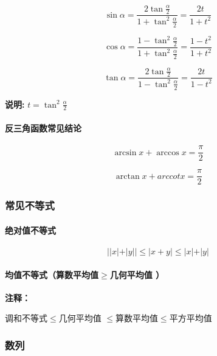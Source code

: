 \documentclass[
]{article}
\begin{document}
\[\sin \alpha = \frac{2\tan{\frac{\alpha}{2}}}{1+\tan^2 \frac{\alpha}{2}} = \frac{2t}{1+t^2}\]

\[\cos \alpha = \frac{1-\tan^2 \frac{\alpha}{2}}{1+\tan^2{\frac{\alpha}{2}}}=\frac{1-t^2}{1+t^2}\]

\[\tan \alpha = \frac{2\tan{\frac{\alpha}{2}}}{1-\tan^2\frac{\alpha}{2}}=\frac{2t}{1-t^2}\]

\textbf{说明:} \(t = \tan^2 \frac{\alpha}{2}\)

\hypertarget{ux53cdux4e09ux89d2ux51fdux6570ux5e38ux89c1ux7ed3ux8bba}{%
\paragraph{反三角函数常见结论}\label{ux53cdux4e09ux89d2ux51fdux6570ux5e38ux89c1ux7ed3ux8bba}}

\[\arcsin x + \arccos x = \frac{\pi}{2}\]

\[\arctan x + arccot x = \frac{\pi}{2}\]

\hypertarget{ux5e38ux89c1ux4e0dux7b49ux5f0f}{%
\subsubsection{常见不等式}\label{ux5e38ux89c1ux4e0dux7b49ux5f0f}}

\hypertarget{ux7eddux5bf9ux503cux4e0dux7b49ux5f0f}{%
\paragraph{绝对值不等式}\label{ux7eddux5bf9ux503cux4e0dux7b49ux5f0f}}

\[\vert \vert x \vert + \vert y \vert \vert \le \vert x +y \vert \le \vert x \vert + \vert y \vert\]

\hypertarget{ux5747ux503cux4e0dux7b49ux5f0fux7b97ux6570ux5e73ux5747ux503cuxaux2265uxaux51e0ux4f55ux5e73ux5747ux503c-uxff09}{%
\paragraph{\texorpdfstring{均值不等式（算数平均值\(\ge\)几何平均值
）}{均值不等式（算数平均值\textbackslash ge几何平均值 ）}}\label{ux5747ux503cux4e0dux7b49ux5f0fux7b97ux6570ux5e73ux5747ux503cuxaux2265uxaux51e0ux4f55ux5e73ux5747ux503c-uxff09}}

\textbf{注释：}

调和不等式\(\le\)几何平均值 \(\le\)算数平均值\(\le\)平方平均值

\hypertarget{ux6570ux5217}{%
\subsubsection{数列}\label{ux6570ux5217}}
\end{document}
